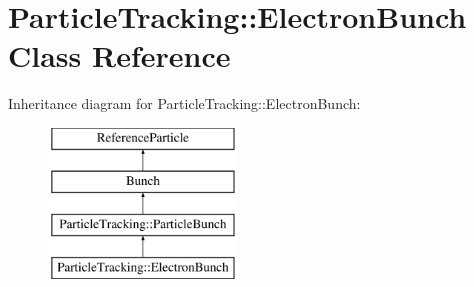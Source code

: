 \hypertarget{classParticleTracking_1_1ElectronBunch}{}\section{Particle\+Tracking\+:\+:Electron\+Bunch Class Reference}
\label{classParticleTracking_1_1ElectronBunch}
Inheritance diagram for Particle\+Tracking\+:\+:Electron\+Bunch\+:\begin{figure}[H]
\begin{center}
\leavevmode
\includegraphics[height=4.000000cm]{classParticleTracking_1_1ElectronBunch}
\end{center}
\end{figure}
